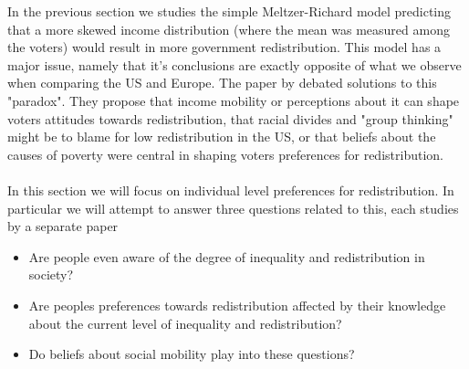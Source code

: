 In the previous section we studies the simple Meltzer-Richard model predicting that a more skewed income distribution (where the mean was measured among the voters) would result in more government redistribution. This model has a major issue, namely that it's conclusions are exactly opposite of what we observe when comparing the US and Europe. The paper by \citeauthor{alesina_why_2001} debated solutions to this "paradox". They propose that income mobility or perceptions about it can shape voters attitudes towards redistribution, that racial divides and "group thinking" might be to blame for low redistribution in the US, or that beliefs about the causes of poverty were central in shaping voters preferences for redistribution. 
\\ \\
In this section we will focus on individual level preferences for redistribution. In particular we will attempt to answer three questions related to this, each studies by a separate paper 
\begin{itemize}
    \item Are people even aware of the degree of inequality and redistribution in society? \citep{gimpelson_misperceiving_2018}
    \item Are peoples preferences towards redistribution affected by their knowledge about the current level of inequality and redistribution? \citep{kuziemko_how_2015} 
    \item Do beliefs about social mobility play into these questions? \citep{alesina_why_2001} 
\end{itemize}

